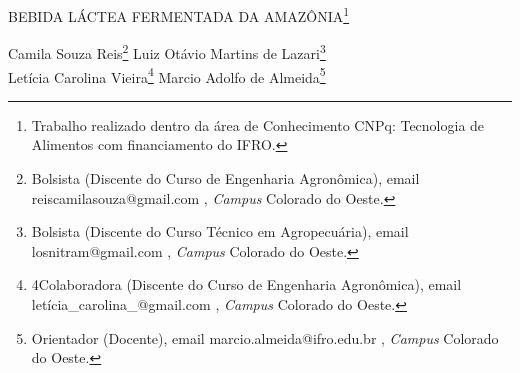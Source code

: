 \documentclass[article,12pt,onesidea,4paper,english,brazil]{abntex2}
\begin{document}
	
	
	\frenchspacing 
	
	\begin{center}
		\LARGE BEBIDA LÁCTEA FERMENTADA DA AMAZÔNIA\footnote{Trabalho realizado dentro da área de Conhecimento CNPq: Tecnologia de Alimentos com financiamento do IFRO.}
		
		\normalsize
		Camila Souza Reis\footnote{Bolsista (Discente do Curso de Engenharia Agronômica), email reiscamilasouza@gmail.com , \textit{Campus} Colorado do Oeste.} 
		Luiz Otávio Martins de Lazari\footnote{Bolsista (Discente do Curso Técnico em Agropecuária), email losnitram@gmail.com , \textit{Campus} Colorado do Oeste.} \\
		Letícia Carolina Vieira\footnote{4Colaboradora (Discente do Curso de Engenharia Agronômica), email letícia\_carolina\_@gmail.com , \textit{Campus} Colorado do Oeste.} 
		Marcio Adolfo de Almeida\footnote{Orientador (Docente), email marcio.almeida@ifro.edu.br , \textit{Campus} Colorado do Oeste.} 
	\end{center}
	
\end{document}
